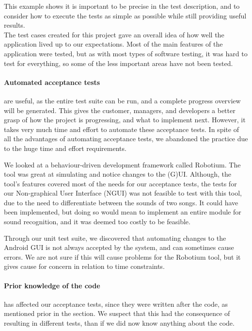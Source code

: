 This example shows it is important to be precise in the test description, and to consider how to execute the tests as simple as possible while still providing useful results.\\

The test cases created for this project gave an overall idea of how well the application lived up to our expectations.
Most of the main features of the application were tested, but as with most types of software testing, it was hard to test for everything, so some of the less important areas have not been tested.

\paragraph{Automated acceptance tests} are useful, as the entire test suite can be run, and a complete progress overview will be generated.
This gives the customer, managers, and developers a better grasp of how the project is progressing, and what to implement next.
However, it takes very much time and effort to automate these acceptance tests.
In spite of all the advantages of automating acceptance tests, we abandoned the practice due to the huge time and effort requirements.

We looked at a behaviour-driven development framework called Robotium.
The tool was great at simulating and notice changes to the (G)UI.
Although, the tool's features covered most of the needs for our acceptance tests, the tests for our Non-graphical User Interface (NGUI) was not feasible to test with this tool, due to the need to differentiate between the sounds of two songs.
It could have been implemented, but doing so would mean to implement an entire module for sound recognition, and it was deemed too costly to be feasible. 

Through our unit test suite, we discovered that automating changes to the Android GUI is not always accepted by the system, and can sometimes cause errors.
We are not sure if this will cause problems for the Robotium tool, but it gives cause for concern in relation to time constraints.

\paragraph{Prior knowledge of the code} has affected our acceptance tests, since they were written after the code, as mentioned prior in the section. We suspect that this had the consequence of resulting in different tests, than if we did now know anything about the code. 

